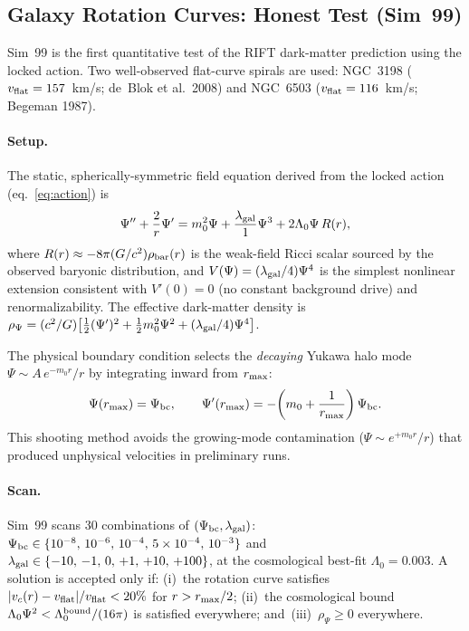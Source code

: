 \documentclass[12pt,a4paper]{article}
\begin{document}
\subsection{Galaxy Rotation Curves: Honest Test (Sim~99)}
\label{sec:sim99}

Sim~99 is the first quantitative test of the RIFT dark-matter prediction
using the locked action.  Two well-observed flat-curve spirals are used:
NGC~3198 ($v_{\rm flat} = 157$~km/s; de~Blok et al.\ 2008) and
NGC~6503 ($v_{\rm flat} = 116$~km/s; Begeman 1987).

\paragraph{Setup.}
The static, spherically-symmetric field equation derived from the locked
action (eq.~\ref{eq:action}) is
\begin{equation}
  \Psi'' + \frac{2}{r}\Psi' = m_0^2\Psi + \frac{\lambda_{\rm gal}}{1}\Psi^3
    + 2\Lambda_0\Psi\,R(r),
\label{eq:psi_galactic}
\end{equation}
where $R(r) \approx -8\pi(G/c^2)\rho_{\rm bar}(r)$ is the weak-field
Ricci scalar sourced by the observed baryonic distribution, and
$V(\Psi) = (\lambda_{\rm gal}/4)\Psi^4$ is the simplest nonlinear
extension consistent with $V'(0) = 0$ (no constant background drive) and
renormalizability.  The effective dark-matter density is
$\rho_\Psi = (c^2/G)\bigl[\tfrac{1}{2}(\Psi')^2 + \tfrac{1}{2}m_0^2\Psi^2
+ (\lambda_{\rm gal}/4)\Psi^4\bigr]$.

The physical boundary condition selects the \emph{decaying} Yukawa halo
mode $\Psi \sim A\,e^{-m_0 r}/r$ by integrating inward from $r_{\rm max}$:
\begin{equation}
  \Psi(r_{\rm max}) = \Psi_{\rm bc}, \qquad
  \Psi'(r_{\rm max}) = -\!\left(m_0 + \frac{1}{r_{\rm max}}\right)\Psi_{\rm bc}.
\end{equation}
This shooting method avoids the growing-mode contamination
($\Psi \sim e^{+m_0 r}/r$) that produced unphysical velocities
in preliminary runs.

\paragraph{Scan.}
Sim~99 scans 30 combinations of $(\Psi_{\rm bc}, \lambda_{\rm gal})$:
$\Psi_{\rm bc} \in \{10^{-8},\,10^{-6},\,10^{-4},\,5\times10^{-4},\,10^{-3}\}$
and $\lambda_{\rm gal} \in \{-10,\,-1,\,0,\,+1,\,+10,\,+100\}$, at the
cosmological best-fit $\Lambda_0 = 0.003$.  A solution is accepted only if:
(i)~the rotation curve satisfies $|v_c(r)-v_{\rm flat}|/v_{\rm flat} < 20\%$
for $r > r_{\rm max}/2$; (ii)~the cosmological bound
$\Lambda_0\Psi^2 < \Lambda_0^{\rm bound}/(16\pi)$ is satisfied everywhere;
and~(iii)~$\rho_\Psi \geq 0$ everywhere.
\end{document}
